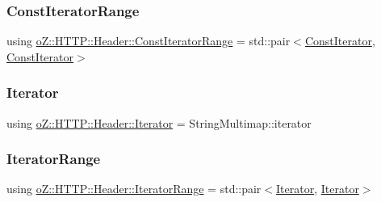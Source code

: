 \mbox{\label{classo_z_1_1_h_t_t_p_1_1_header_a0823c7353e93de315929c96457563c3d}} 
\subsubsection{\texorpdfstring{ConstIteratorRange}{ConstIteratorRange}}
{\footnotesize\ttfamily using \mbox{\hyperlink{classo_z_1_1_h_t_t_p_1_1_header_a0823c7353e93de315929c96457563c3d}{o\+Z\+::\+H\+T\+T\+P\+::\+Header\+::\+Const\+Iterator\+Range}} =  std\+::pair$<$\mbox{\hyperlink{classo_z_1_1_h_t_t_p_1_1_header_a509c1ea8f5b221246e6e49c01a115d69}{Const\+Iterator}}, \mbox{\hyperlink{classo_z_1_1_h_t_t_p_1_1_header_a509c1ea8f5b221246e6e49c01a115d69}{Const\+Iterator}}$>$}

\mbox{\label{classo_z_1_1_h_t_t_p_1_1_header_a572d529cae124a02fb68df9c3e51c576}} 
\subsubsection{\texorpdfstring{Iterator}{Iterator}}
{\footnotesize\ttfamily using \mbox{\hyperlink{classo_z_1_1_h_t_t_p_1_1_header_a572d529cae124a02fb68df9c3e51c576}{o\+Z\+::\+H\+T\+T\+P\+::\+Header\+::\+Iterator}} =  String\+Multimap\+::iterator}

\mbox{\label{classo_z_1_1_h_t_t_p_1_1_header_a226f04d25adf24d2a683f82ef8327812}} 
\subsubsection{\texorpdfstring{IteratorRange}{IteratorRange}}
{\footnotesize\ttfamily using \mbox{\hyperlink{classo_z_1_1_h_t_t_p_1_1_header_a226f04d25adf24d2a683f82ef8327812}{o\+Z\+::\+H\+T\+T\+P\+::\+Header\+::\+Iterator\+Range}} =  std\+::pair$<$\mbox{\hyperlink{classo_z_1_1_h_t_t_p_1_1_header_a572d529cae124a02fb68df9c3e51c576}{Iterator}}, \mbox{\hyperlink{classo_z_1_1_h_t_t_p_1_1_header_a572d529cae124a02fb68df9c3e51c576}{Iterator}}$>$}



